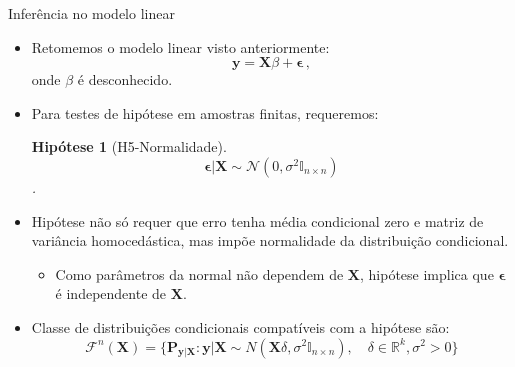 \documentclass[11pt]{beamer}
\newtheorem{assumption}{Hipótese}
\begin{document}
\begin{frame}{Inferência no modelo linear}
\begin{itemize}
	\item Retomemos o modelo linear visto anteriormente:
$$\boldsymbol{y} =\boldsymbol{X}\beta + \boldsymbol{\epsilon}\, ,$$
onde $\beta$ é desconhecido.
\item Para testes de hipótese em amostras finitas, requeremos:
\begin{assumption}[H5-Normalidade]
$$\boldsymbol{\epsilon}|\boldsymbol{X}\sim \mathcal{N}(0,\sigma^2 \mathbb{I}_{n\times n})$$.
\end{assumption}
\item Hipótese não só requer que erro tenha média condicional zero e matriz de variância homocedástica, mas impõe normalidade da distribuição condicional.
\begin{itemize}
	\item Como parâmetros da normal não dependem de $\boldsymbol{X}$, hipótese implica que $\boldsymbol{\epsilon}$ é independente de $\boldsymbol{X}$.
\end{itemize}
\item Classe de distribuições condicionais compatíveis com a hipótese são:
$$\mathcal{F}^n(\boldsymbol{X}) = \{\boldsymbol{P}_{\boldsymbol{y}|\boldsymbol{X}}: \boldsymbol{y}|\boldsymbol{X}\sim N(\boldsymbol{X}\delta, \sigma^2 \mathbb{I}_{n\times n}),\quad \delta \in \mathbb{R}^k, \sigma^2>0\}$$ 
\end{itemize}
\end{frame}
\end{document}

